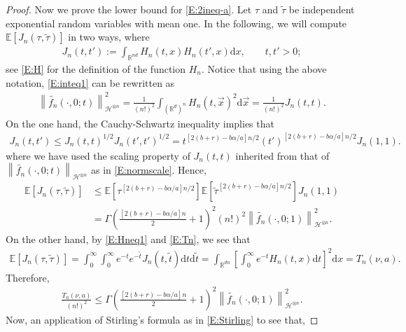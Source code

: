 \documentclass[12pt]{report}
\theoremstyle{plain}
\theoremstyle{definition}
\numberwithin{equation}{section}
\newcommand{\R}{\mathbb{R}}
\newcommand{\Norm}[1]{\left\|  #1   \right\|}
\newcommand{\ud}{\ensuremath{ \mathrm{d} }}
\begin{document}
\begin{proof}
	Now we prove the lower bound for \eqref{E:2ineq-a}. Let $\tau$ and $\widetilde{\tau}$ be
	independent exponential random variables with mean one. In the following, we will compute
	$\mathbb{E}[J_n(\tau,\widetilde{\tau})]$ in two ways, where
	\begin{align*}
	J_n(t,t') := \int_{\R^{nd}} H_n(t,x)H_n(t',x) \ud x, \qquad t,t'>0;
	\end{align*}
	see \eqref{E:H} for the definition of the function $H_n$. Notice that using the above notation,
	\eqref{E:inteq1} can be rewritten as
	\begin{align*}
	\Norm{\widetilde{f_n}(\cdot,0;t)}_{\mathcal{H}^{\otimes n}}^2 = \frac{1}{(n!)^2} \int_{(\R^{d})^n} H_n(t,\vec{x})^2\ud \vec{x} = \frac{1}{(n!)^2} J_n(t,t).
	\end{align*}
	On the one hand, the Cauchy-Schwartz inequality implies that
	\begin{align*}
	J_n(t,t') \le J_n(t,t)^{1/2}J_n(t',t')^{1/2} =  t^{[2(b + r ) -b \alpha / a]n/2} ( t' )^{[2(b + r ) -b \alpha / a]n/2} J_n(1,1).
	\end{align*}
	where we have used the scaling property of $J_n(t,t)$ inherited from that of
	$\Norm{\widetilde{f_n}(\cdot,0;t)}_{\mathcal{H}^{\otimes n}}$ as in \eqref{E:normscale}. Hence,
	\begin{align*}
	\mathbb{E}[J_n(\tau,\widetilde{\tau})]
	& \le \mathbb{E}\left[  {\tau}^{[2(b + r ) -b \alpha / a]n/2} \right] \mathbb{E}\left[  {\widetilde{\tau}}^{[2(b + r ) -b \alpha / a]n/2} \right]J_n(1,1) \\
	& = \Gamma\left( \frac{[2(b + r ) -b \alpha / a]n}{2} +1 \right)^2 (n!)^2  \Norm{\widetilde{f_n}(\cdot,0;1) }_{ \mathcal{H}^{\otimes n} }^2.
	\end{align*}
	On the other hand, by \eqref{E:Hneq1} and \eqref{E:Tn}, we see that
	\begin{align*}
	\mathbb{E}[J_n(\tau,\widetilde{\tau})]
	= \int_0^\infty \int_0^\infty e^{-t}e^{-\widetilde{t}}J_n(t,\widetilde{t}) \ud t \ud \widetilde{t}
	= \int_{\R^{dn}}\left[ \int_0^\infty e^{-t}H_n(t,x) \ud t \right]^2 \ud x
	= T_n\left(\nu,a\right).
	\end{align*}
	Therefore,
	\begin{align} \label{E:2lowbd}
	\frac{T_n(\nu,a)}{(n!)^2} \le \Gamma\left( \frac{[2(b + r ) -b \alpha / a]n}{2} +1 \right)^2
	\Norm{ \widetilde{f_n}(\cdot,0;1) }_{ \mathcal{H}^{\otimes n} }^2 .
	\end{align}
	Now, an application of Stirling's formula as in \eqref{E:Stirling} to see that,

\end{proof}
\end{document}
